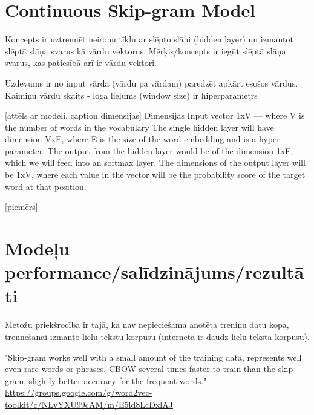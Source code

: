 \section{Continuous Skip-gram Model}


Koncepts ir uztrennēt neironu tīklu ar slēpto slāni (hidden layer) un izmantot slēptā slāņa svarus kā vārdu vektorus.
Mērķis/koncepts ir iegūt slēptā slāņa svarus, kas patiesībā arī ir vārdu vektori.

Uzdevums ir no input vārda (vārdu pa vārdam) paredzēt apkārt esošos vārdus. Kaimiņu vārdu skaits - loga lielums (window size) ir hiperparametrs

[attēls ar modeli, caption dimensijas]
Dimensijas
Input vector 1xV — where V is the number of words in the vocabulary
The single hidden layer will have dimension VxE, where E is the size of the word embedding and is a hyper-parameter.
The output from the hidden layer would be of the dimension 1xE, which we will feed into an softmax layer.
The dimensions of the output layer will be 1xV, where each value in the vector will be the probability score of the target word at that position.

[piemērs]


\cite{mccormick2016}


\section{Modeļu performance/salīdzinājums/rezultāti}

Metožu priekšrocība ir tajā, ka nav nepieciešama anotēta treniņu datu kopa, trennēšanai izmanto lielu tekstu korpusu (internetā ir daudz lielu teksta korpusu).


"Skip-gram works well with a small amount of the training data, represents well even rare words or phrases.
CBOW several times faster to train than the skip-gram, slightly better accuracy for the frequent words." 
\url{https://groups.google.com/g/word2vec-toolkit/c/NLvYXU99cAM/m/E5ld8LcDxlAJ}
